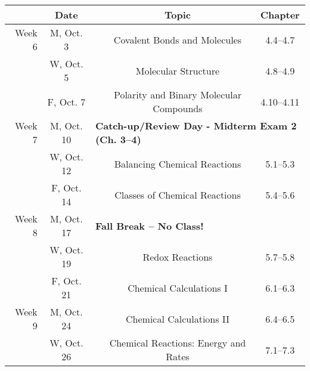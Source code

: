 \documentclass[12pt, letterpaper]{article}
\begin{document}
\noindent\begin{tabular}{rcccc}
	       & Date       &                                                                              & Topic                                               & Chapter    \\
	\midrule
	Week 6 & M, Oct. 3  &                                                                              & Covalent Bonds and Molecules                        & 4.4--4.7   \\
	       & W, Oct. 5  &                                                                              & Molecular Structure                                 & 4.8--4.9   \\
	       & F, Oct. 7  &                                                                              & Polarity and Binary Molecular Compounds             & 4.10--4.11 \\
	\midrule
	Week 7 & M, Oct. 10 & \multicolumn{3}{l}{\textbf{Catch-up/Review Day - Midterm Exam 2 (Ch. 3--4)}}                                                                    \\
	       & W, Oct. 12 &                                                                              & Balancing Chemical Reactions                        & 5.1--5.3   \\
	       & F, Oct. 14 &                                                                              & Classes of Chemical Reactions                       & 5.4--5.6   \\
	\midrule
	Week 8 & M, Oct. 17 & \multicolumn{3}{l}{\textbf{Fall Break -- No Class!}}                                                                                            \\
	       & W, Oct. 19 &                                                                              & Redox Reactions                                     & 5.7--5.8   \\
	       & F, Oct. 21 &                                                                              & Chemical Calculations I                             & 6.1--6.3   \\
	\midrule
	Week 9 & M, Oct. 24 &                                                                              & Chemical Calculations II                            & 6.4--6.5   \\
	       & W, Oct. 26 &                                                                              & Chemical Reactions: Energy and Rates                & 7.1--7.3   \\

\end{tabular}
\end{document}
